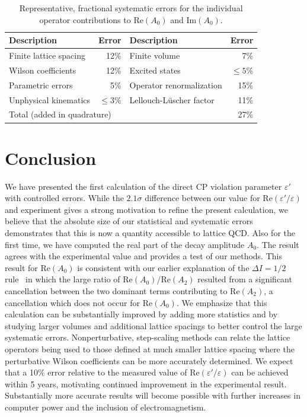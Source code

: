 \documentclass[aps,prl,
superscriptaddress,
showpacs,
preprintnumbers,
bibnotes,
amsmath,
amssymb,
twocolumn,
floatfix,
]{revtex4-1}
\begin{document}
\begin{table}[!htp]
  \centering
  \begin{tabular}{lr|lr}
   Description & Error & Description & Error\\
    \hline\hline
Finite lattice spacing		& 12\% 		& Finite volume 			&   7\% \\
Wilson coefficients			& 12\%		& Excited states			&   $\le5$\% \\
Parametric errors			&  5\% 		& Operator renormalization	& 15\% \\ 
Unphysical kinematics            &   $\le3$\% 	& Lellouch-L\"uscher factor	& 11\% \\
    \hline
\multicolumn{3}{l}{Total (added in quadrature)}						& 27\% \\
    \hline
  \end{tabular}
  \caption{Representative, fractional systematic errors for the individual operator contributions to Re$(A_0)$ and Im$(A_0)$.}
\label{tab:sys_errors}
\end{table}

\section{Conclusion}

We have presented the first calculation of the direct CP violation parameter $\varepsilon'$ with controlled errors.    While the $2.1\sigma$ difference between our value for Re$(\varepsilon'/\varepsilon)$ and experiment gives a strong motivation to refine the present calculation, we believe that the absolute size of our statistical and systematic errors demonstrates that this is now a quantity accessible to lattice QCD.  Also for the first time, we have computed the real part of the decay amplitude $A_0$.  The result agrees with the experimental value and provides a test of our methods.   This result for Re$(A_0)$ is  consistent with our earlier explanation of the $\Delta I=1/2$ rule~\cite{Boyle:2012ys} in which the large ratio of Re$(A_0)$/Re$(A_2)$ resulted from a significant cancellation between the two dominant terms contributing to Re$(A_2)$, a cancellation which does not occur for Re$(A_0)$.  We emphasize that this calculation can be substantially improved by adding more statistics and by studying larger volumes and additional lattice spacings to better control the large systematic errors.  Nonperturbative, step-scaling methods can relate the lattice operators being used to those defined at much smaller lattice spacing where the perturbative Wilson coefficients can be more accurately determined.  We expect that a 10\% error relative to the measured value of Re$(\varepsilon'/\varepsilon)$ can be achieved within 5 years, motivating continued improvement in the experimental result.  Substantially more accurate results will become possible with further increases in computer power and the inclusion of electromagnetism. 
\end{document}
